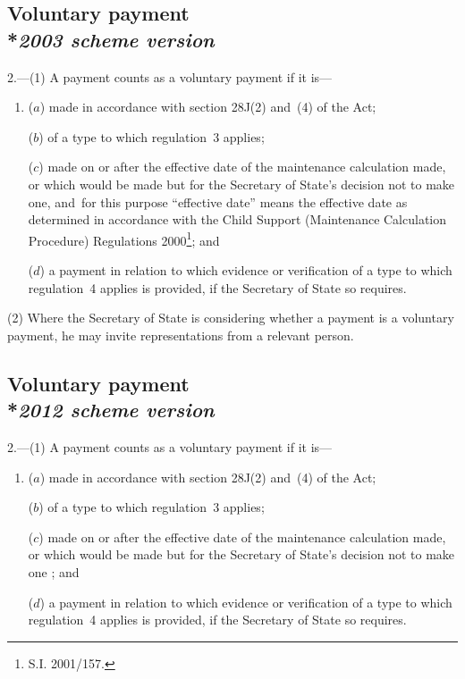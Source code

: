 \documentclass[12pt,a4paper]{article}
\begin{document}
\subsection[2. Voluntary payment --- \emph{2003 scheme version}]{Voluntary payment\\*\emph{2003 scheme version}}

2.---(1)  A payment counts as a voluntary payment if it is—
\begin{enumerate}\item[]
($a$) made in accordance with section 28J(2) and~(4) of the Act;

($b$) of a type to which regulation~3 applies;

($c$) made on or after the effective date of the maintenance calculation made, or which would be made but for the Secretary of State’s decision not to make one, and~for this purpose “effective date” means the effective date as determined in accordance with the Child Support (Maintenance Calculation Procedure) Regulations 2000\footnote{\frenchspacing S.I. 2001/157.}; and

($d$) a payment in relation to which evidence or verification of a type to which regulation~4 applies is provided, if the Secretary of State so requires.
\end{enumerate}

(2) Where the Secretary of State is considering whether a payment is a voluntary payment, he may invite representations from a relevant person.

\subsection[2. Voluntary payment --- \emph{2012 scheme version}]{Voluntary payment\\*\emph{2012 scheme version}}

2.---(1)  A payment counts as a voluntary payment if it is—
\begin{enumerate}\item[]
($a$) made in accordance with section 28J(2) and~(4) of the Act;

($b$) of a type to which regulation~3 applies;

($c$) made on or after the effective date of the maintenance calculation made, or which would be made but for the Secretary of State’s decision not to make one%
; and

($d$) a payment in relation to which evidence or verification of a type to which regulation~4 applies is provided, if the Secretary of State so requires.
\end{enumerate}
\end{document}
